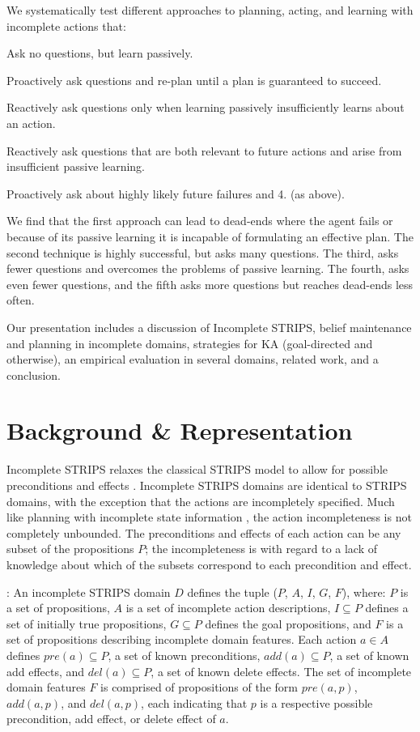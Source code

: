 \documentclass[letterpaper]{article}
\def\und#1{\noindent{\bf #1}:}
\def\citep#1{\cite{#1}}
\newenvironment{packed_enum}{
\begin{enumerate}
  \setlength{\itemsep}{1pt}
  \setlength{\parskip}{0pt}
  \setlength{\parsep}{0pt}
}{\end{enumerate}}
\begin{document}
We systematically test different approaches to planning, acting, and learning
with incomplete actions that:
\begin{packed_enum}
\item Ask no questions, but learn passively. 
\item Proactively ask questions and re-plan until a plan is guaranteed to
succeed.
\item Reactively ask questions only when learning passively insufficiently
learns about an action.
\item Reactively ask questions that are both relevant to future actions and
arise from insufficient passive learning.
\item  Proactively ask about
highly likely future failures and 4. (as above).
\end{packed_enum}
We find that the first approach can lead to dead-ends where the agent fails or
because of its passive learning it is incapable of formulating an effective
plan.  The second technique is highly successful, but asks many questions.  The
third, asks fewer questions and overcomes the problems of passive learning.  The
fourth, asks even fewer questions, and the fifth asks more questions but reaches
dead-ends less often.

Our presentation includes a discussion of Incomplete STRIPS, belief maintenance
and planning in incomplete domains, strategies for KA
(goal-directed and otherwise), an empirical evaluation in several domains,
related work, and a conclusion.

\section{Background \& Representation}\label{sec:background}

Incomplete STRIPS relaxes the classical STRIPS model to allow for
possible preconditions and effects \citep{Garland02}.  
Incomplete STRIPS domains are identical to STRIPS domains, with the exception
that the actions are incompletely specified.  Much like planning with incomplete
state information \citep{bonet00planning}, the action incompleteness is not
completely unbounded.  The preconditions and effects of each action can be any
subset of the propositions $P$; the incompleteness is with regard to a lack of
knowledge about which of the subsets correspond to each precondition and effect.        

\und{Incomplete STRIPS Domains} An incomplete STRIPS domain ${D}$  defines the
tuple ($P$, ${A}$, $I$, $G$, $F$), where: $P$ is a  set of propositions, ${A}$
is a set of incomplete  action descriptions, $I \subseteq P$ defines a set of
initially true  propositions, $G \subseteq P$ defines the goal propositions, and
$F$ is a set of propositions describing incomplete domain features. Each action
${a} \in {A}$ defines $pre({a}) \subseteq P$, a set of known preconditions,
$add({a}) \subseteq P$, a set of known add  effects, and $del({a}) \subseteq P$,
a set of known delete effects.   The set of incomplete domain features $F$ is
comprised of propositions of the form $pre({a}, p)$, $add({a}, p)$, and
$del({a}, p)$, each indicating that $p$ is a respective possible precondition, add effect, or
delete effect of $a$.
\end{document}
